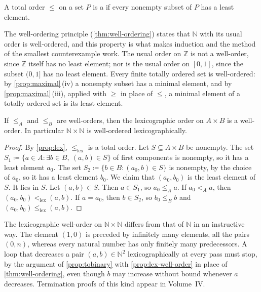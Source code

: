 \begin{definition}
\label{def:well-order}
A total order $\le$ on a set $P$ is a  if every nonempty subset of $P$ has a least element.
\end{definition}

The well-ordering principle (\cref{thm:well-ordering}) states that $\mathbb N$ with its usual order is well-ordered, and this property is what makes induction and the method of the smallest counterexample work. The usual order on $\mathbb Z$ is not a well-order, since $\mathbb Z$ itself has no least element; nor is the usual order on $[0,1]$, since the subset $(0,1]$ has no least element. Every finite totally ordered set is well-ordered: by \cref{prop:maximal}\,(iv) a nonempty subset has a minimal element, and by \cref{prop:maximal}\,(iii), applied with $\ge$ in place of $\le$, a minimal element of a totally ordered set is its least element.

\begin{proposition}
\label{prop:lex-well-order}
If $\le_A$ and $\le_B$ are well-orders, then the lexicographic order on $A\times B$ is a well-order. In particular $\mathbb N\times\mathbb N$ is well-ordered lexicographically.
\end{proposition}

\begin{proof}
By \cref{prop:lex}, $\le_{\mathrm{lex}}$ is a total order. Let $S\subseteq A\times B$ be nonempty. The set $S_1\coloneqq\{a\in A:\exists b\in B,\ (a,b)\in S\}$ of first components is nonempty, so it has a least element $a_0$. The set $S_2\coloneqq\{b\in B: (a_0,b)\in S\}$ is nonempty, by the choice of $a_0$, so it has a least element $b_0$. We claim that $(a_0,b_0)$ is the least element of $S$. It lies in $S$. Let $(a,b)\in S$. Then $a\in S_1$, so $a_0\le_Aa$. If $a_0<_Aa$, then $(a_0,b_0)<_{\mathrm{lex}}(a,b)$. If $a=a_0$, then $b\in S_2$, so $b_0\le_Bb$ and $(a_0,b_0)\le_{\mathrm{lex}}(a,b)$.
\end{proof}

The lexicographic well-order on $\mathbb N\times\mathbb N$ differs from that of $\mathbb N$ in an instructive way. The element $(1,0)$ is preceded by infinitely many elements, all the pairs $(0,n)$, whereas every natural number has only finitely many predecessors. A loop that decreases a pair $(a,b)\in\mathbb N^2$ lexicographically at every pass must stop, by the argument of \cref{prop:tobinary} with \cref{prop:lex-well-order} in place of \cref{thm:well-ordering}, even though $b$ may increase without bound whenever $a$ decreases. Termination proofs of this kind appear in Volume~IV.

